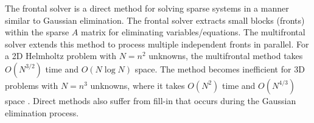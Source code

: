 \documentclass[11pt]{article}
\begin{document}
The frontal solver \cite{irons1970frontal} is a direct method for solving sparse 
systems in a manner similar to Gaussian elimination. The frontal solver extracts 
small blocks (fronts) within the sparse $A$ matrix for eliminating variables/equations. 
The multifrontal solver \cite{duff1983multifrontal} extends this method to process 
multiple independent fronts in parallel. For a 2D Helmholtz problem with $N=n^2$ unknowns, 
the multifrontal method takes $O(N^{3/2})$ time and $O(N \log N)$ space. The method 
becomes inefficient for 3D problems with $N=n^3$ unknowns, where it takes $O(N^2)$ 
time and $O(N^{4/3})$ space \cite{engquist2011matrix}. Direct methods also suffer 
from fill-in \cite{erlangga2008advances} that occurs during the Gaussian elimination process.







\end{document}
